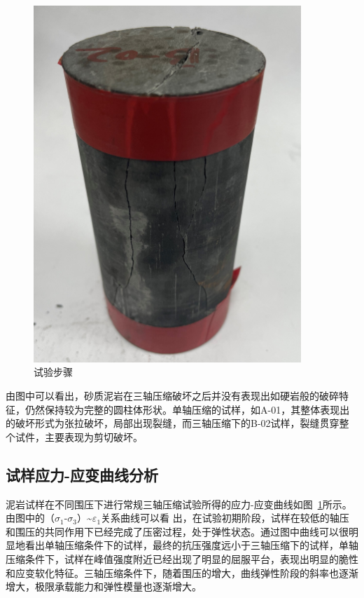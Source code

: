 \begin{figure}[ht!]
{\begin{minipage}{7cm}
            \includegraphics[width=0.9\textwidth]{img/chap2/B-02.jpg}
        \end{minipage}
    }
    \caption{试验步骤}
    \label{fig:2-4}
\end{figure}

由图中可以看出，砂质泥岩在三轴压缩破坏之后并没有表现出如硬岩般的破碎特
征，仍然保持较为完整的圆柱体形状。单轴压缩的试样，如A-01，其整体表现出的破坏形式为张拉破坏，局部出现裂缝，而三轴压缩下的B-02试样，裂缝贯穿整个试件，主要表现为剪切破坏。


\subsection{试样应力-应变曲线分析}
泥岩试样在不同围压下进行常规三轴压缩试验所得的应力-应变曲线如图~\ref{fig:2-4}所示。由图中的（$\sigma_1$-$\sigma_3$）\textasciitilde $\varepsilon_1$关系曲线可以看
出，在试验初期阶段，试样在较低的轴压和围压的共同作用下已经完成了压密过程，处于弹性状态。通过图中曲线可以很明显地看出单轴压缩条件下的试样，最终的抗压强度远小于三轴压缩下的试样，单轴压缩条件下，试样在峰值强度附近已经出现了明显的屈服平台，表现出明显的脆性和应变软化特征。三轴压缩条件下，随着围压的增大，曲线弹性阶段的斜率也逐渐增大，极限承载能力和弹性模量也逐渐增大。

